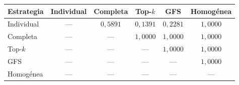 \begin{resulttable}
\centering\fontsize{9}{11}\selectfont\setlength{\tabcolsep}{3.6pt}
\caption{Valores $p$ ajustados mediante Holm para las diez comparaciones de macro-F1 entre estrategias (21 descriptores; cuatro datasets). Ninguna comparación rechaza a $\alpha=0{,}05$.}
\label{tab:holm-primary}
\begin{tabular}{@{}lccccc@{}}
\toprule
Estrategia & Individual & Completa & Top-$k$ & GFS & Homogénea \\
\midrule
Individual & --- & $0{,}5891$ & $0{,}1391$ & $0{,}2281$ & $1{,}0000$ \\
Completa & --- & --- & $1{,}0000$ & $1{,}0000$ & $1{,}0000$ \\
Top-$k$ & --- & --- & --- & $1{,}0000$ & $1{,}0000$ \\
GFS & --- & --- & --- & --- & $1{,}0000$ \\
Homogénea & --- & --- & --- & --- & --- \\
\bottomrule
\end{tabular}
\par{}
\end{resulttable}
\FloatBarrier
